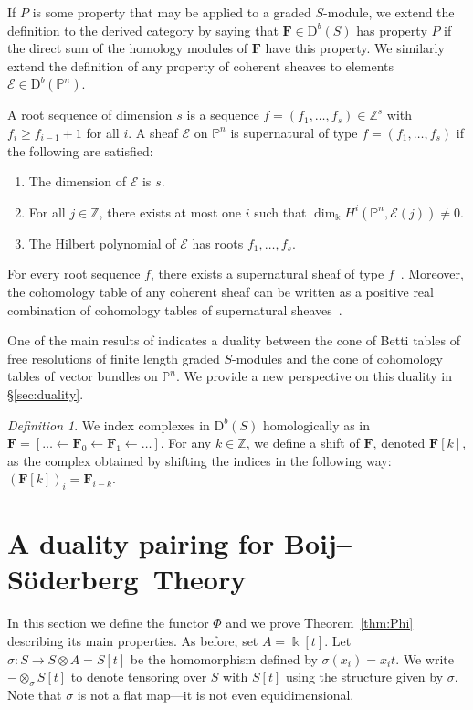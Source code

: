 \documentclass[12pt]{amsart}
\theoremstyle{definition}
\theoremstyle{remark}
\newtheorem{defn}[lemma]{Definition}
\newcommand{\kk}{\Bbbk}
\newcommand{\PP}{\mathbb{P}}
\newcommand{\ZZ}{\mathbb{Z}}
\newcommand{\cE}{\mathcal{E}}
\newcommand{\FF}{\mathbf{F}}
\newcommand{\defi}[1]{\textsf{#1}} %
\newcommand{\DD}{\mathrm{D}}
\def\BS{Boij--S\"oderberg~}
\begin{document}
If $P$ is some property that may be applied to a graded $S$-module, we extend the definition to the derived category by saying that $\FF \in \DD^b(S)$ has property $P$ if the direct sum of the homology modules of $\FF$ have this property. We similarly extend the definition of any property of coherent sheaves to elements $\cE\in \DD^b(\PP^n)$.  

A \defi{root sequence of dimension $s$} is a sequence $f=(f_1,\dots,f_s)\in \mathbb Z^{s}$ with $f_i\geq f_{i-1}+1$ for all $i$.  
A sheaf $\cE$ on $\PP^{n}$ is
\defi{supernatural of type} $f=(f_1, \dots, f_{s})$ if the following are satisfied: 
\begin{enumerate}
\item The dimension of $\cE$ is $s$.
\item For all $j\in \mathbb Z$, there exists at most one $i$ 
		such that $\dim_\Bbbk H^i(\PP^{n}, \cE(j))\ne 0$.
\item The Hilbert polynomial of $\cE$ has roots $f_1, \dots, f_{s}$.
\end{enumerate}
For every root sequence $f$, there exists a supernatural sheaf of type
$f$~\cite[Theorem~0.4]{eis-schrey1}.
Moreover, the cohomology table of any coherent sheaf 
can be written as a positive real combination of cohomology tables 
of supernatural sheaves~\cite[Theorem~0.1]{eis-schrey1}.  

One of the main results of \cite{eis-schrey1} indicates a duality between the cone of Betti tables of free resolutions of finite length graded $S$-modules and the cone of cohomology tables of vector bundles on $\PP^n$.  We provide a new perspective on this duality in \S\ref{sec:duality}. 


\begin{defn}
We index complexes in $\DD^b(S)$ homologically as in $\FF=[\dots \gets \FF_0\gets \FF_1\gets \dots]$.  For any $k\in \ZZ$, we define a \defi{shift} of $\FF$, denoted $\FF[k]$, as the complex obtained by shifting the indices in the following way:  $(\FF[k])_i=\FF_{i-k}$.
\end{defn}


\section{A duality pairing for \BS Theory}\label{sec:duality pairing}
In this section we define the functor $\Phi$ and we prove Theorem~\ref{thm:Phi} describing its main properties.  As before, set $A= \kk[t]$. Let 
$\sigma\colon S\to S\otimes A = S[t]$
be the homomorphism defined by $\sigma(x_{i})=x_{i}t$. 
We write $-\otimes_\sigma S[t]$ to denote tensoring over $S$ with $S[t]$ using the structure
given by $\sigma$. Note that $\sigma$ is not a flat map---it is not even equidimensional.
\end{document}
